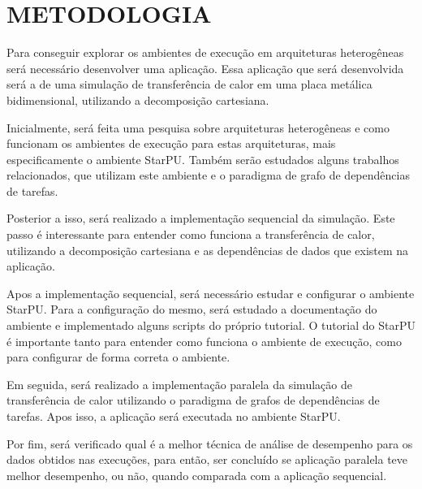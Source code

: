 
\chapter{METODOLOGIA}
\label{chap:metodologia}

Para conseguir explorar os ambientes de execução em arquiteturas heterogêneas será necessário desenvolver uma aplicação.
Essa aplicação que será desenvolvida será a de uma simulação de transferência de calor em uma placa metálica bidimensional,
utilizando a decomposição cartesiana.

Inicialmente, será feita uma pesquisa sobre arquiteturas heterogêneas e como funcionam os ambientes de execução para estas arquiteturas,
mais especificamente o ambiente StarPU.
Também serão estudados alguns trabalhos relacionados, que utilizam este ambiente e o paradigma de grafo de dependências de tarefas.

Posterior a isso, será realizado a implementação sequencial da simulação.
Este passo é interessante para entender como funciona a transferência de calor, utilizando a decomposição cartesiana e as dependências de
dados que existem na aplicação.

Apos a implementação sequencial, será necessário estudar e configurar o ambiente StarPU. Para a configuração do mesmo,
será estudado a documentação do ambiente e implementado alguns scripts do próprio tutorial.
O tutorial do StarPU é importante tanto para entender como funciona o ambiente de execução, como para configurar de forma correta o ambiente.

Em seguida, será realizado a implementação paralela da simulação de transferência de calor utilizando o paradigma de grafos de dependências de tarefas.
Apos isso, a aplicação será executada no ambiente StarPU.

Por fim, será verificado qual é a melhor técnica de análise de desempenho para os dados obtidos nas execuções,
para então, ser concluído se aplicação paralela teve melhor desempenho, ou não, quando comparada com a aplicação sequencial.